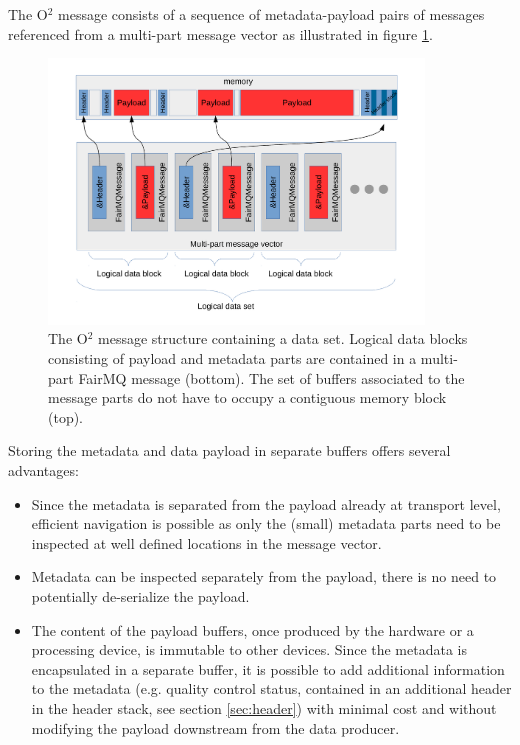 \documentclass[a4paper,twoside]{article}
\def\O2{O$^2$}
\begin{document}
The \O2 message consists of a sequence of metadata-payload pairs of messages referenced from a multi-part message vector as illustrated in figure \ref{fig:o2message}.

\begin{figure}[h]
  \centering
  \includegraphics[width=0.89\textwidth]{multipartO2message.pdf}
  \caption{The \O2 message structure containing a data set. Logical data blocks consisting of payload and metadata parts are contained in a multi-part FairMQ message (bottom). The set of buffers associated to the message parts do not have to occupy a contiguous memory block (top).}
  \label{fig:o2message} 
\end{figure}

Storing the metadata and data payload in separate buffers offers several advantages:
\begin{itemize}
  \item Since the metadata is separated from the payload already at transport level, efficient navigation is possible as only the (small) metadata parts need to be inspected at well defined locations in the message vector.
  \item Metadata can be inspected separately from the payload, there is no need to potentially de-serialize the payload.
  \item The content of the payload buffers, once produced by the hardware or a processing device, is immutable to other devices. Since the metadata is encapsulated in a separate buffer, it is possible to add additional information to the metadata (e.g. quality control status, contained in an additional header in the header stack, see section \ref{sec:header}) with minimal cost and without modifying the payload downstream from the data producer.
\end{itemize}
\end{document}
